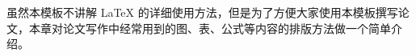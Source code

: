 
\label{sec:pdpintro}

虽然本模板不讲解 \LaTeX{} 的详细使用方法，但是为了方便大家使用本模板撰写论文，本章对论文写作中经常用到的{\hei 图、表、公式}等内容的排版方法做一个简单介绍。

%
%
%
%
%
%
